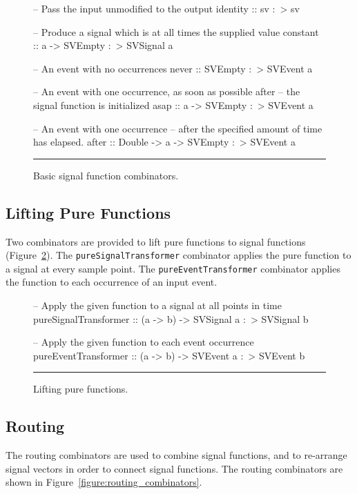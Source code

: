 \begin{figure}
\begin{code}
-- Pass the input unmodified to the output
identity :: sv :~> sv

-- Produce a signal which is at all times the supplied value
constant :: a -> SVEmpty :~> SVSignal a

-- An event with no occurrences
never    :: SVEmpty :~> SVEvent a

-- An event with one occurrence, as soon as possible after
-- the signal function is initialized
asap     :: a -> SVEmpty :~> SVEvent a

-- An event with one occurrence
-- after the specified amount of time has elapsed.
after    :: Double -> a -> SVEmpty :~> SVEvent a
\end{code}
\hrule
\caption{Basic signal function combinators.}
\label{figure:basic_signal_functions}
\end{figure}

\subsection{Lifting Pure Functions}
\label{subsection:System_Design_and_Interface-Combinators-Lifting_Pure_Functions}

Two combinators are provided to lift pure functions to signal functions
(Figure~\ref{figure:lifting_pure_functions}). The {\tt pureSignalTransformer}
combinator applies the pure function to a signal at every sample point. The
{\tt pureEventTransformer} combinator applies the function to each occurrence of
an input event.

\begin{figure}
\begin{code}
-- Apply the given function to a signal at all points in time
pureSignalTransformer :: (a -> b) -> SVSignal a :~> SVSignal b

-- Apply the given function to each event occurrence
pureEventTransformer  :: (a -> b) -> SVEvent a :~> SVEvent b
\end{code}
\hrule
\caption{Lifting pure functions.}
\label{figure:lifting_pure_functions}
\end{figure}

\subsection{Routing}
\label{subsection:System_Design_and_Interface-Combinators-Routing}

The routing combinators are used to combine signal functions, and
to re-arrange signal vectors in order to connect signal functions.
The routing combinators are shown in Figure~\ref{figure:routing_combinators}.

